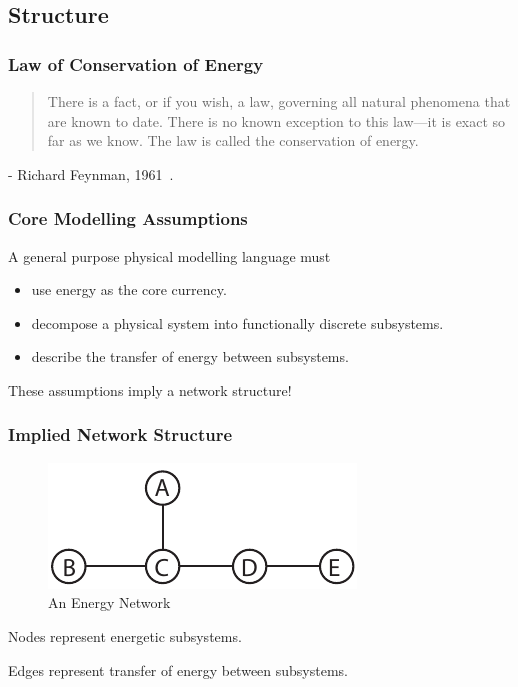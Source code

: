 \documentclass[11pt,reqno]{beamer}
\begin{document}
\subsection{Structure}
\begin{frame}
\frametitle{Law of Conservation of Energy}
\begin{quotation}
There is a fact, or if you wish, a law, governing all natural phenomena that are known to date. There is no known exception to this law—it is exact so far as we know. The law is called the conservation of energy.
\end{quotation}

- Richard Feynman, 1961~\cite{Feynman1961}.
\end{frame}
\begin{frame}
\frametitle{Core Modelling Assumptions}
A general purpose physical modelling language must
\begin{itemize}
	\item use energy as the core currency.
	\item decompose a physical system into functionally discrete subsystems.
	\item describe the transfer of energy between subsystems.
\end{itemize}
\vspace{1cm}
These assumptions imply a network structure!

\end{frame}
\begin{frame}
\frametitle{Implied Network Structure}
\begin{figure}
	\centering
\includegraphics{images/network_1.pdf}
\caption{An Energy Network}
\end{figure}
Nodes represent energetic subsystems.

\vspace{5pt}

Edges represent transfer of energy between subsystems.
\end{frame}
\end{document}
